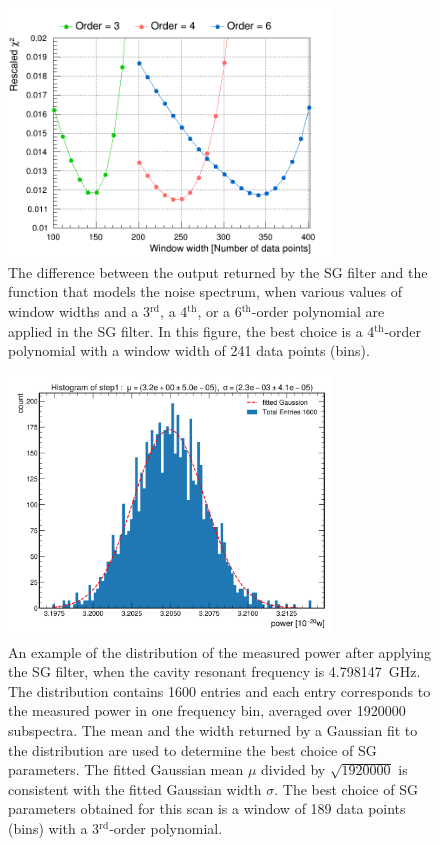 \begin{figure} [htbp]
  \centering
  \includegraphics[width=8.6cm]{figures/chi2_Different_Order_Window_SGFilter.png}
  \caption{The difference between the output returned by the SG filter 
  and the function that models the noise spectrum, when various values of 
  window widths and 
  a 3$^\text{rd}$, a 4$^\text{th}$, or a 
  6$^\text{th}$-order polynomial are applied in the SG filter. In this 
  figure, the best choice is a 4$^\text{th}$-order polynomial with 
  a window width of 241 data points (bins). }
  \label{fig:sgoptimize}
\end{figure}
 


\begin{figure} [htbp]
  \centering
  \includegraphics[width=8.6cm]{figures/sysSG_temphistogram.png}
  \caption{An example of the distribution of the measured power after 
applying the SG filter, when 
the cavity resonant frequency is 4.798147~GHz. The distribution contains 
1600 entries and each entry corresponds to the measured power 
in one frequency bin, averaged
over 1920000 subspectra. The mean and the width returned by 
a Gaussian fit to the distribution are used to determine the best choice of 
SG parameters. The fitted Gaussian mean $\mu$ divided by 
$\sqrt{1920000}$ is consistent 
with the fitted Gaussian width $\sigma$. The best choice of SG parameters 
obtained for this scan is a window of 189 data points (bins) with a 
3$^\text{rd}$-order polynomial. 
}
  \label{fig:noisegauss}
\end{figure}
 

